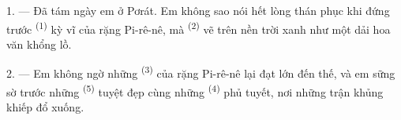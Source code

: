 %
%
%
%
%

\VUsaut{4.0mm}
\VUsaut{3.0mm}

\VUsaut{3.0mm}

\VUsaut{3.0mm}

1. --- Đã tám ngày em ở Pơrát. Em không sao nói hết lòng thán phục khi đứng trước
 \textsuperscript{(1)} kỳ vĩ của rặng Pi-rê-nê, mà 
\textsuperscript{(2)} vẽ trên nền trời xanh như một dải hoa văn khổng lồ.

2. --- Em không ngờ những  \textsuperscript{(3)} của rặng Pi-rê-nê lại
đạt  lớn đến thế, và em sững sờ trước những 
\textsuperscript{(5)} tuyệt đẹp cùng những  \textsuperscript{(4)} phủ
tuyết, nơi những trận  khủng khiếp đổ xuống.

